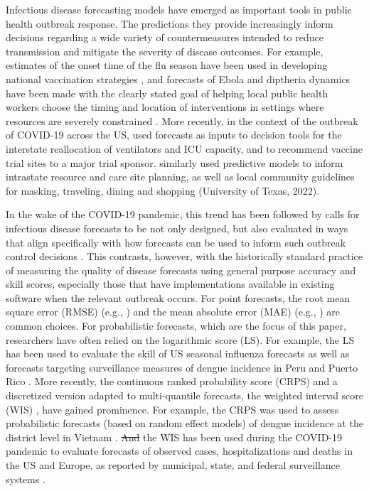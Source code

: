 \documentclass{article}\usepackage[]{graphicx}\usepackage[]{xcolor}
\providecommand{\DIFaddtex}[1]{{\protect\color{blue}\uwave{#1}}} %
\providecommand{\DIFdeltex}[1]{{\protect\color{red}\sout{#1}}}                      %
\providecommand{\DIFaddbegin}{} %
\providecommand{\DIFaddend}{} %
\providecommand{\DIFdelbegin}{} %
\providecommand{\DIFdelend}{} %
\providecommand{\DIFadd}[1]{\texorpdfstring{\DIFaddtex{#1}}{#1}} %
\providecommand{\DIFdel}[1]{\texorpdfstring{\DIFdeltex{#1}}{}} %
\newcommand{\DIFscaledelfig}{0.5}
\newlength{\DIFdelgraphicswidth} %
\newlength{\DIFdelgraphicsheight} %
\newcommand{\DIFaddincludegraphics}[2][]{{\color{blue}\fbox{\DIFOincludegraphics[#1]{#2}}}} %
\newcommand{\DIFdelincludegraphics}[2][]{%
\sbox{\DIFdelgraphicsbox}{\DIFOincludegraphics[#1]{#2}}%
\settoboxwidth{\DIFdelgraphicswidth}{\DIFdelgraphicsbox} %
\settoboxtotalheight{\DIFdelgraphicsheight}{\DIFdelgraphicsbox} %
\scalebox{\DIFscaledelfig}{%
\parbox[b]{\DIFdelgraphicswidth}{\usebox{\DIFdelgraphicsbox}\\[-\baselineskip] \rule{\DIFdelgraphicswidth}{0em}}\llap{\resizebox{\DIFdelgraphicswidth}{\DIFdelgraphicsheight}{%
\setlength{\unitlength}{\DIFdelgraphicswidth}%
\begin{picture}(1,1)%
\thicklines\linethickness{2pt} %
{\color[rgb]{1,0,0}\put(0,0){\framebox(1,1){}}}%
{\color[rgb]{1,0,0}\put(0,0){\line( 1,1){1}}}%
{\color[rgb]{1,0,0}\put(0,1){\line(1,-1){1}}}%
\end{picture}%
}\hspace*{3pt}}} %
} %
\DeclareRobustCommand{\DIFaddbegin}{\DIFOaddbegin \let\includegraphics\DIFaddincludegraphics} %
\DeclareRobustCommand{\DIFaddend}{\DIFOaddend \let\includegraphics\DIFOincludegraphics} %
\DeclareRobustCommand{\DIFdelbegin}{\DIFOdelbegin \let\includegraphics\DIFdelincludegraphics} %
\DeclareRobustCommand{\DIFdelend}{\DIFOaddend \let\includegraphics\DIFOincludegraphics} %
\begin{document}
Infectious disease forecasting models have emerged as important tools in public health outbreak response. The
predictions they provide increasingly inform decisions regarding a wide variety of countermeasures intended to reduce
transmission and mitigate the severity of disease outcomes. For example, estimates of the onset time of the flu season
have been used in developing national vaccination strategies \citep{igboh2023timing}, and forecasts of Ebola and
diptheria dynamics have been made with the clearly stated goal of helping local public health workers choose the timing
and location of interventions in settings where resources are severely constrained 
\citep{meltzer2014estimating, rainisch2015regional, camacho2015-ebola-bed,finger_real-time_2019}. More recently, in the
context of the outbreak of COVID-19 across the US, \cite{bertsimas2021predictionsCOVID} used forecasts as inputs to
decision tools for the interstate reallocation of ventilators and ICU capacity, and to recommend vaccine trial sites to
a major trial sponsor. \cite{fox_real-time_2022} similarly used predictive models to inform intrastate resource and
care site planning, as well as local community guidelines for masking, traveling, dining and shopping (University of
Texas, 2022)\nocite{utnews2022}.

In the wake of the COVID-19 pandemic, this trend has been followed by calls for infectious disease forecasts to be not
only designed, but also evaluated in ways that align specifically with how forecasts can be used to inform such outbreak
control decisions \citep{marshall2023predictions, bilinski_adaptive_2023}. This contrasts, however, with the
historically standard practice of measuring the quality of disease forecasts using general purpose accuracy and skill
scores, especially those that have implementations available in existing software when the relevant outbreak occurs. For
point forecasts, the root mean square error (RMSE) (e.g., \cite{papastefanopoulos2020covid}) and the mean absolute error
(MAE) (e.g., \cite{johansson2016evaluating}) are common choices. For probabilistic forecasts, which are the focus of
this paper, researchers have often relied on the logarithmic score (LS). For example, the LS has been used to evaluate
the skill of US seasonal influenza forecasts \citep{mcgowan_collaborative_2019,reich_collaborative_2019} as well as
forecasts targeting surveillance measures of dengue incidence in Peru and Puerto Rico \citep{johansson_open_2019}. More
recently, the continuous ranked probability score (CRPS) and a discretized version adapted to multi-quantile forecasts,
the weighted interval score (WIS) \citep{bracher2021evaluating}, have gained prominence. For example, the CRPS was used
to assess probabilistic forecasts (based on random effect models) of dengue incidence at the district level in Vietnam
\citep{colon-gonzalez_probabilistic_2021}. \DIFdelbegin \DIFdel{And }\DIFdelend \DIFaddbegin \DIFadd{Likewise, }\DIFaddend the WIS has been used during the COVID-19 pandemic to evaluate forecasts
of observed cases, hospitalizations and deaths in the US and Europe, as reported by municipal, state, and federal
surveillance systems \citep{cramer_evaluation_2022,fox_real-time_2022,sherratt2023predictive}.
\end{document}
